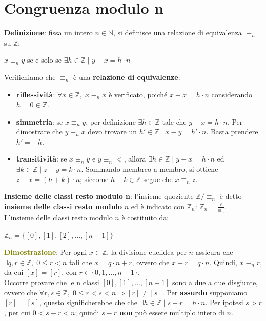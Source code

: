 \section{Congruenza modulo n}
\textbf{Definizione}: fissa un intero $n \in \mathbb{N}$, si definisce una relazione di equivalenza $\equiv_n$ su $\mathbb{Z}$:
\begin{center}
    $x \equiv_n y$ se e solo se $\exists h \in \mathbb{Z} \; | \; y - x = h \cdot n$
\end{center}
Verifichiamo che $\equiv_n$ è una \textbf{relazione di equivalenze}:
\begin{itemize}[nosep]
    \item \textbf{riflessività}: $\forall x \in \mathbb{Z}, \; x \equiv_n x$ è verificato, poiché $x - x = h \cdot n$ considerando $h = 0 \in \mathbb{Z}$.
    \item \textbf{simmetria}: se $x \equiv_n y$, per definizione $\exists h \in \mathbb{Z}$ tale che $y - x = h \cdot n$. Per dimostrare che $y \equiv_n x$ devo trovare un $h' \in \mathbb{Z} \; | \; x-y = h' \cdot n$. Basta prendere $h'=-h$.
    \item \textbf{transitività}: se $x \equiv_n y$ e $y \equiv_n <$, allora $\exists h \in \mathbb{Z} \; | \; y - x = h \cdot n$ ed $\exists k \in \mathbb{Z} \; | \; z - y = k \cdot n$. Sommando membreo a membro, si ottiene $z - x = (h + k) \cdot n$; siccome $h + k \in \mathbb{Z}$ segue che $x \equiv_n z$.
\end{itemize}
\textbf{Insieme delle classi resto modulo n}: l'insieme quoziente $\mathbb{Z}/ \equiv_n$ è detto \textbf{insieme delle classi resto modulo} $n$ ed è indicato con $\mathbb{Z}_n$: $\mathbb{Z}_n = \frac{\mathbb{Z}}{\equiv_n}$. \\
L'insieme delle classi resto modulo $n$ è costituito da: 
\begin{center}
    $\mathbb{Z}_n = \{[0], [1], [2], ..., [n-1]\}$
\end{center}
\textcolor{olive}{\textbf{Dimostrazione}}: Per ogni $x \in \mathbb{Z}$, la divisione euclidea per $n$ assicura che $\exists q,r \in \mathbb{Z}, \; 0 \leq r < n$ tali che $x = q \cdot n + r$, ovvero che $x - r = q \cdot n$. Quindi, $x \equiv_n r$, da cui $[x] = [r]$, con $r \in \{0,1,..., n-1\}$. \\
Occorre provare che le n classi $[0], [1], ..., [n-1]$ sono a due a due disgiunte, ovvero che $\forall r,s \in \mathbb{Z}, \; 0 \leq r < s < n \Rightarrow [r] \neq [s]$. Per \textbf{assurdo} supponiamo $[r] = [s]$, questo significherebbe che che $\exists h \in \mathbb{Z} \; | \; s - r = h \cdot n$. Per ipotesi $s > r$, per cui $0 < s - r < n$; quindi $s - r$ \textbf{non} può essere multiplo intero di $n$.

